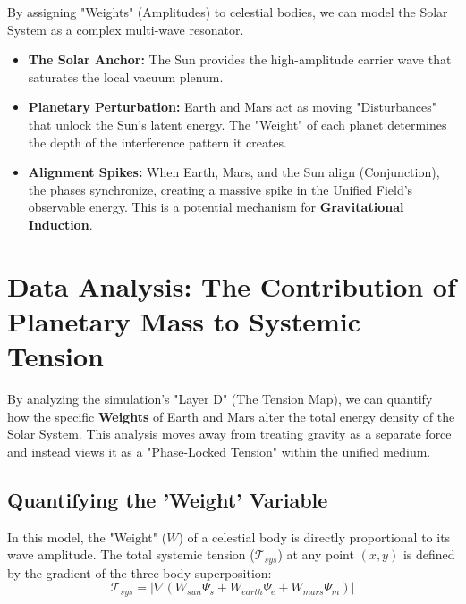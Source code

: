 \documentclass[11pt]{article}
\begin{document}
By assigning "Weights" (Amplitudes) to celestial bodies, we can model the Solar System as a complex multi-wave resonator.

\begin{itemize}
    \item \textbf{The Solar Anchor:} The Sun provides the high-amplitude carrier wave that saturates the local vacuum plenum.
    \item \textbf{Planetary Perturbation:} Earth and Mars act as moving "Disturbances" that unlock the Sun's latent energy. The "Weight" of each planet determines the depth of the interference pattern it creates.
    \item \textbf{Alignment Spikes:} When Earth, Mars, and the Sun align (Conjunction), the phases synchronize, creating a massive spike in the Unified Field's observable energy. This is a potential mechanism for \textbf{Gravitational Induction}.
\end{itemize}

\section*{Data Analysis: The Contribution of Planetary Mass to Systemic Tension}

By analyzing the simulation’s "Layer D" (The Tension Map), we can quantify how the specific \textbf{Weights} of Earth and Mars alter the total energy density of the Solar System. This analysis moves away from treating gravity as a separate force and instead views it as a "Phase-Locked Tension" within the unified medium.

\subsection*{Quantifying the 'Weight' Variable}
In this model, the "Weight" ($W$) of a celestial body is directly proportional to its wave amplitude. The total systemic tension ($\mathcal{T}_{sys}$) at any point $(x,y)$ is defined by the gradient of the three-body superposition:
\begin{equation}
    \mathcal{T}_{sys} = \left| \nabla \left( W_{sun} \Psi_s + W_{earth} \Psi_e + W_{mars} \Psi_m \right) \right|
\end{equation}
\end{document}
